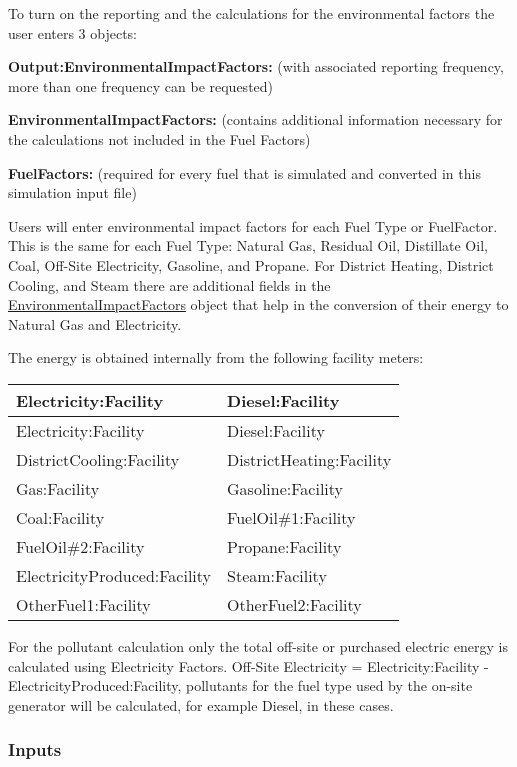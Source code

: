 To turn on the reporting and the calculations for the environmental factors the user enters 3 objects:

\textbf{Output:EnvironmentalImpactFactors:} (with associated reporting frequency, more than one frequency can be requested)

\textbf{EnvironmentalImpactFactors:} (contains additional information necessary for the calculations not included in the Fuel Factors)

\textbf{FuelFactors:} (required for every fuel that is simulated and converted in this simulation input file)

Users will enter environmental impact factors for each Fuel Type or FuelFactor. This is the same for each Fuel Type: Natural Gas, Residual Oil, Distillate Oil, Coal, Off-Site Electricity, Gasoline, and Propane. For District Heating, District Cooling, and Steam there are additional fields in the \hyperref[environmentalimpactfactors]{EnvironmentalImpactFactors} object that help in the conversion of their energy to Natural Gas and Electricity.

The energy is obtained internally from the following facility meters:

\begin{longtable}[c]{@{}ll@{}}
\toprule
Electricity:Facility & Diesel:Facility \tabularnewline
\midrule
\endfirsthead

\toprule
Electricity:Facility & Diesel:Facility \tabularnewline
\midrule
\endhead

DistrictCooling:Facility & DistrictHeating:Facility \tabularnewline
Gas:Facility & Gasoline:Facility \tabularnewline
Coal:Facility & FuelOil\#1:Facility \tabularnewline
FuelOil\#2:Facility & Propane:Facility \tabularnewline
ElectricityProduced:Facility & Steam:Facility \tabularnewline
OtherFuel1:Facility & OtherFuel2:Facility \tabularnewline
\bottomrule
\end{longtable}

For the pollutant calculation only the total off-site or purchased electric energy is calculated using Electricity Factors. Off-Site Electricity = Electricity:Facility - ElectricityProduced:Facility, pollutants for the fuel type used by the on-site generator will be calculated, for example Diesel, in these cases.

\subsubsection{Inputs}\label{inputs-9-017}

